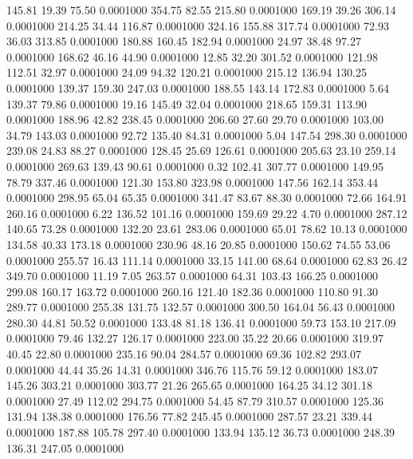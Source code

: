  145.81   19.39   75.50   0.0001000
 354.75   82.55  215.80   0.0001000
 169.19   39.26  306.14   0.0001000
 214.25   34.44  116.87   0.0001000
 324.16  155.88  317.74   0.0001000
  72.93   36.03  313.85   0.0001000
 180.88  160.45  182.94   0.0001000
  24.97   38.48   97.27   0.0001000
 168.62   46.16   44.90   0.0001000
  12.85   32.20  301.52   0.0001000
 121.98  112.51   32.97   0.0001000
  24.09   94.32  120.21   0.0001000
 215.12  136.94  130.25   0.0001000
 139.37  159.30  247.03   0.0001000
 188.55  143.14  172.83   0.0001000
   5.64  139.37   79.86   0.0001000
  19.16  145.49   32.04   0.0001000
 218.65  159.31  113.90   0.0001000
 188.96   42.82  238.45   0.0001000
 206.60   27.60   29.70   0.0001000
 103.00   34.79  143.03   0.0001000
  92.72  135.40   84.31   0.0001000
   5.04  147.54  298.30   0.0001000
 239.08   24.83   88.27   0.0001000
 128.45   25.69  126.61   0.0001000
 205.63   23.10  259.14   0.0001000
 269.63  139.43   90.61   0.0001000
   0.32  102.41  307.77   0.0001000
 149.95   78.79  337.46   0.0001000
 121.30  153.80  323.98   0.0001000
 147.56  162.14  353.44   0.0001000
 298.95   65.04   65.35   0.0001000
 341.47   83.67   88.30   0.0001000
  72.66  164.91  260.16   0.0001000
   6.22  136.52  101.16   0.0001000
 159.69   29.22    4.70   0.0001000
 287.12  140.65   73.28   0.0001000
 132.20   23.61  283.06   0.0001000
  65.01   78.62   10.13   0.0001000
 134.58   40.33  173.18   0.0001000
 230.96   48.16   20.85   0.0001000
 150.62   74.55   53.06   0.0001000
 255.57   16.43  111.14   0.0001000
  33.15  141.00   68.64   0.0001000
  62.83   26.42  349.70   0.0001000
  11.19    7.05  263.57   0.0001000
  64.31  103.43  166.25   0.0001000
 299.08  160.17  163.72   0.0001000
 260.16  121.40  182.36   0.0001000
 110.80   91.30  289.77   0.0001000
 255.38  131.75  132.57   0.0001000
 300.50  164.04   56.43   0.0001000
 280.30   44.81   50.52   0.0001000
 133.48   81.18  136.41   0.0001000
  59.73  153.10  217.09   0.0001000
  79.46  132.27  126.17   0.0001000
 223.00   35.22   20.66   0.0001000
 319.97   40.45   22.80   0.0001000
 235.16   90.04  284.57   0.0001000
  69.36  102.82  293.07   0.0001000
  44.44   35.26   14.31   0.0001000
 346.76  115.76   59.12   0.0001000
 183.07  145.26  303.21   0.0001000
 303.77   21.26  265.65   0.0001000
 164.25   34.12  301.18   0.0001000
  27.49  112.02  294.75   0.0001000
  54.45   87.79  310.57   0.0001000
 125.36  131.94  138.38   0.0001000
 176.56   77.82  245.45   0.0001000
 287.57   23.21  339.44   0.0001000
 187.88  105.78  297.40   0.0001000
 133.94  135.12   36.73   0.0001000
 248.39  136.31  247.05   0.0001000

